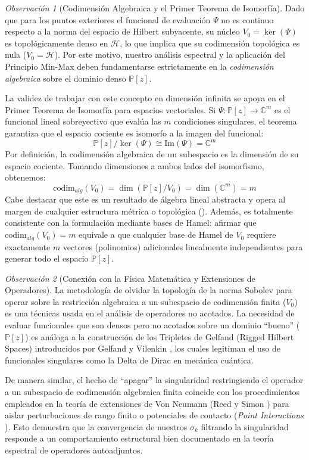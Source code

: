 \documentclass[12pt,a4paper]{article}
\theoremstyle{definition}
\theoremstyle{remark}
\newtheorem{observacion}{Observación}
\begin{document}
\begin{observacion}[Codimensión Algebraica y el Primer Teorema de Isomorfía]
    Dado que para los puntos exteriores el funcional de evaluación $\Psi$ no es continuo respecto a la norma del espacio de Hilbert subyacente, su núcleo $V_0 = \ker(\Psi)$ es topológicamente denso en $\mathcal{H}$, lo que implica que su codimensión topológica es nula ($\overline{V_0} = \mathcal{H}$). Por este motivo, nuestro análisis espectral y la aplicación del Principio Min-Max deben fundamentarse estrictamente en la \textit{codimensión algebraica} sobre el dominio denso $\mathbb{P}[z]$.

    La validez de trabajar con este concepto en dimensión infinita se apoya en el Primer Teorema de Isomorfía para espacios vectoriales. Si $\Psi: \mathbb{P}[z] \to \mathbb{C}^m$ es el funcional lineal sobreyectivo que evalúa las $m$ condiciones singulares, el teorema garantiza que el espacio cociente es isomorfo a la imagen del funcional:
    \[ \mathbb{P}[z] / \ker(\Psi) \cong \text{Im}(\Psi) = \mathbb{C}^m \]
    Por definición, la codimensión algebraica de un subespacio es la dimensión de su espacio cociente. Tomando dimensiones a ambos lados del isomorfismo, obtenemos:
    \[ \text{codim}_{alg}(V_0) = \dim(\mathbb{P}[z] / V_0) = \dim(\mathbb{C}^m) = m \]
    Cabe destacar que este es un resultado de álgebra lineal abstracta y opera al margen de cualquier estructura métrica o topológica (\cite{roman2007advanced, kreyszig1989introductory}). Además, es totalmente consistente con la formulación mediante bases de Hamel: afirmar que $\text{codim}_{alg}(V_0) = m$ equivale a que cualquier base de Hamel de $V_0$ requiere exactamente $m$ vectores (polinomios) adicionales linealmente independientes para generar todo el espacio $\mathbb{P}[z]$.
\end{observacion}

\begin{observacion}[Conexión con la Física Matemática y Extensiones de Operadores]
    La metodología de olvidar la topología de la norma Sobolev para operar sobre la restricción algebraica a un subespacio de codimensión finita ($V_0$) es una técnicas usada en el análisis de operadores no acotados. La necesidad de evaluar funcionales que son densos pero no acotados sobre un dominio ``bueno'' ($\mathbb{P}[z]$) es análoga a la construcción de los Tripletes de Gelfand (Rigged Hilbert Spaces) introducidos por Gelfand y Vilenkin \cite{gelfand1964generalized}, los cuales legitiman el uso de funcionales singulares como la Delta de Dirac en mecánica cuántica.

    De manera similar, el hecho de ``apagar'' la singularidad restringiendo el operador a un subespacio de codimensión algebraica finita coincide con los procedimientos empleados en la teoría de extensiones de Von Neumann (Reed y Simon \cite{reed1975methods}) para aislar perturbaciones de rango finito o potenciales de contacto (\textit{Point Interactions} \cite{albeverio1988solvable}). Esto demuestra que la convergencia de nuestros $\sigma_k$ filtrando la singularidad responde a un comportamiento estructural bien documentado en la teoría espectral de operadores autoadjuntos.
\end{observacion}
\end{document}
